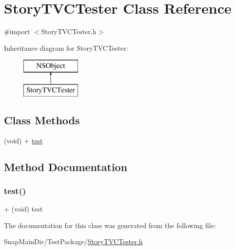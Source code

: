 \hypertarget{interface_story_t_v_c_tester}{}\section{Story\+T\+V\+C\+Tester Class Reference}
\label{interface_story_t_v_c_tester}


{\ttfamily \#import $<$Story\+T\+V\+C\+Tester.\+h$>$}

Inheritance diagram for Story\+T\+V\+C\+Tester\+:\begin{figure}[H]
\begin{center}
\leavevmode
\includegraphics[height=2.000000cm]{interface_story_t_v_c_tester}
\end{center}
\end{figure}
\subsection*{Class Methods}
\begin{DoxyCompactItemize}
\item 
(void) + \hyperlink{interface_story_t_v_c_tester_aa3f1049079d1bebe75d1594324ae8081}{test}
\end{DoxyCompactItemize}


\subsection{Method Documentation}
\hypertarget{interface_story_t_v_c_tester_aa3f1049079d1bebe75d1594324ae8081}{}\label{interface_story_t_v_c_tester_aa3f1049079d1bebe75d1594324ae8081} 
\subsubsection{\texorpdfstring{test()}{test()}}
{\footnotesize\ttfamily + (void) test \begin{DoxyParamCaption}{ }\end{DoxyParamCaption}}



The documentation for this class was generated from the following file\+:\begin{DoxyCompactItemize}
\item 
Snap\+Main\+Dir/\+Test\+Package/\hyperlink{_story_t_v_c_tester_8h}{Story\+T\+V\+C\+Tester.\+h}\end{DoxyCompactItemize}
